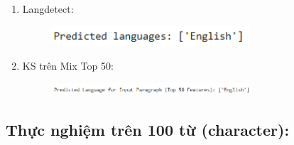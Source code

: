 \begin{enumerate}
    \item Langdetect:
    \begin{figure}[H]
    \centering
    \includegraphics[width=0.7\textwidth]{img/docspics/Picture60.png}
\end{figure}
    \item KS trên Mix Top 50:
    \begin{figure}[H]
    \centering
    \includegraphics[width=0.7\textwidth]{img/docspics/Picture61.png}
\end{figure}
\end{enumerate}

\subsection{Thực nghiệm trên 100 từ (character):}

